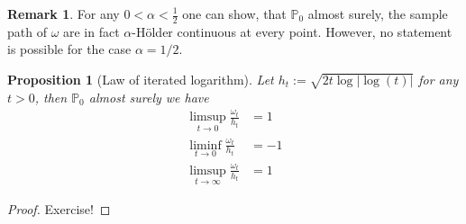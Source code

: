 \documentclass[11pt,a4paper, final]{article}
\newtheorem{prop}{Proposition}[section]
\theoremstyle{definition}
\newtheorem{rem}{Remark}[section]
\begin{document}
\begin{rem} For any $0<\alpha < \frac{1}{2}$ one can show, that $\mathbb{P}_0$ almost surely, the sample path of $\omega$ are in fact $\alpha$-Hölder continuous at every point. However, no statement is possible for the case $ \alpha = 1/2$. 
\end{rem}
\begin{prop}[Law of iterated logarithm] Let $h_t:= \sqrt{ 2t \log | \log(t)|}$ for any $t>0$, then $\mathbb{P}_0$ almost surely we have 
\begin{align*}
\limsup_{t \to 0} \frac{\omega_t}{h_t}&=1 \\
\liminf_{t \to 0} \frac{\omega_t}{h_t}& = -1 \\
\limsup_{t \to \infty} \frac{\omega_t}{h_t} & = 1  
\end{align*}
\end{prop}
\begin{proof}
Exercise! 
\end{proof}
\newpage
\end{document}
